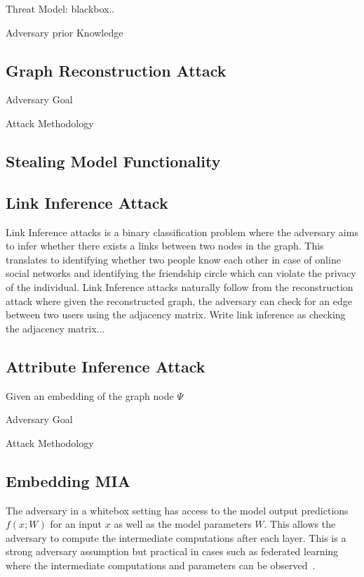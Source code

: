 Threat Model: blackbox..

Adversary prior Knowledge

\subsection{Graph Reconstruction Attack}

Adversary Goal

Attack Methodology

\subsection{Stealing Model Functionality}


\subsection{Link Inference Attack}

Link Inference attacks is a binary classification problem where the adversary aims to infer whether there exists a links between two nodes in the graph.
This translates to identifying whether two people know each other in case of online social networks and identifying the friendship circle which can violate the privacy of the individual.
Link Inference attacks naturally follow from the reconstruction attack where given the reconstructed graph, the adversary can check for an edge between two users using the adjacency matrix.
Write link inference as checking the adjacency matrix...


\subsection{Attribute Inference Attack}

Given an embedding of the graph node $\Psi$

Adversary Goal

Attack Methodology



\subsection{Embedding MIA}

The adversary in a whitebox setting has access to the model output predictions $f(x; W)$ for an input $x$ as well as the model parameters $W$.
This allows the adversary to compute the intermediate computations after each layer.
This is a strong adversary assumption but practical in cases such as federated learning where the intermediate computations and parameters can be observed~\cite{8835245,DBLP:conf/sp/MelisSCS19}.

